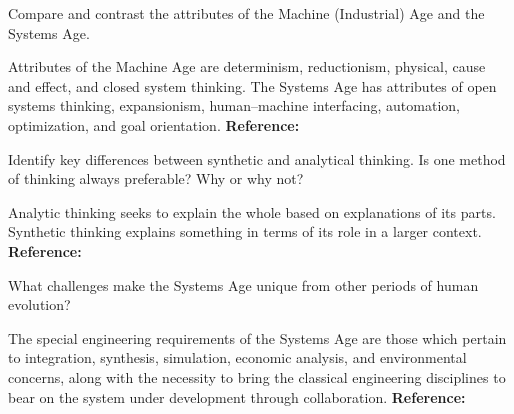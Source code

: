 \begin{exercises}
    \begin{exercise} 
    \label{sea-01-27}
        Compare and contrast the attributes of the Machine (Industrial) Age and the Systems Age.
    \end{exercise}
    \begin{solution}
        Attributes of the Machine Age are determinism, reductionism, physical, cause and effect, and closed system thinking. The Systems Age has attributes of open systems thinking, expansionism, human–machine interfacing, automation, optimization, and goal orientation. \textbf{Reference:}
    \end{solution}
    
    \begin{exercise} 
    \label{sea-01-28}
        Identify key differences between synthetic and analytical thinking. Is one method of thinking always preferable? Why or why not?
    \end{exercise}
    \begin{solution}
        Analytic thinking seeks to explain the whole based on explanations of its parts. Synthetic thinking explains something in terms of its role in a larger context. \textbf{Reference:}
    \end{solution}
    
    \begin{exercise} 
    \label{sea-01-29}
        What challenges make the Systems Age unique from other periods of human evolution?
    \end{exercise}
    \begin{solution}
        The special engineering requirements of the Systems Age are those which pertain to integration, synthesis, simulation, economic analysis, and environmental concerns, along with the necessity to bring the classical engineering disciplines to bear on the system under development through collaboration. \textbf{Reference:}
    \end{solution}
    

\end{exercises}
